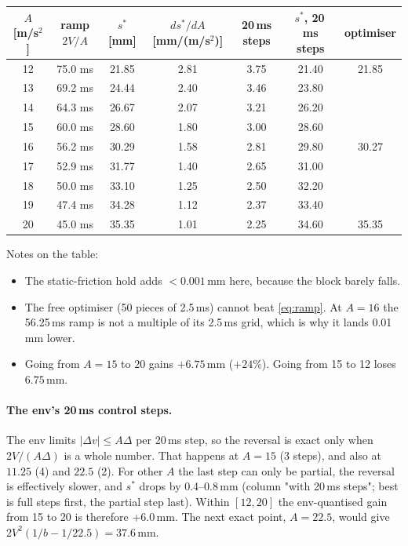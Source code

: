 \documentclass[11pt,a4paper]{article}
\begin{document}
\begin{center}
\small
\begin{tabular}{c|ccc|cc|c}
\toprule
$A$ [m/s$^2$] & ramp $2V/A$ & $s^*$ [mm] & $ds^*/dA$ [mm/(m/s$^2$)] & 20\,ms steps & $s^*$, 20\,ms steps & optimiser\\
\midrule
12 & 75.0 ms & 21.85 & 2.81 & 3.75 & 21.40 & 21.85\\
13 & 69.2 ms & 24.44 & 2.40 & 3.46 & 23.80 & \\
14 & 64.3 ms & 26.67 & 2.07 & 3.21 & 26.20 & \\
15 & 60.0 ms & 28.60 & 1.80 & 3.00 & 28.60 & \\
16 & 56.2 ms & 30.29 & 1.58 & 2.81 & 29.80 & 30.27\\
17 & 52.9 ms & 31.77 & 1.40 & 2.65 & 31.00 & \\
18 & 50.0 ms & 33.10 & 1.25 & 2.50 & 32.20 & \\
19 & 47.4 ms & 34.28 & 1.12 & 2.37 & 33.40 & \\
20 & 45.0 ms & 35.35 & 1.01 & 2.25 & 34.60 & 35.35\\
\bottomrule
\end{tabular}
\end{center}
\noindent Notes on the table:
\begin{itemize}
  \item The static-friction hold adds $<0.001$\,mm here, because the block barely falls.
  \item The free optimiser (50 pieces of 2.5\,ms) cannot beat \eqref{eq:ramp}. At $A=16$ the 56.25\,ms ramp is not a
        multiple of its 2.5\,ms grid, which is why it lands 0.01\,mm lower.
  \item Going from $A=15$ to $20$ gains $+6.75$\,mm ($+24\%$). Going from 15 to 12 loses $6.75$\,mm.
\end{itemize}

\paragraph{The env's 20\,ms control steps.} The env limits $|\Delta v|\le A\Delta$ per 20\,ms step, so the reversal
is exact only when $2V/(A\Delta)$ is a whole number. That happens at $A=15$ (3 steps), and also at $11.25$ (4) and
$22.5$ (2). For other $A$ the last step can only be partial, the reversal is effectively slower, and $s^*$ drops by
0.4--0.8\,mm (column "with 20\,ms steps"; best is full steps first, the partial step last). Within $[12,20]$ the
env-quantised gain from 15 to 20 is therefore $+6.0$\,mm. The next exact point, $A=22.5$, would give
$2V^2(1/b-1/22.5)=37.6$\,mm.
\end{document}
